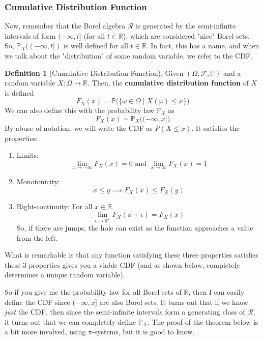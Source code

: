 \documentclass{article}
\theoremstyle{definition}
\theoremstyle{remark}
\theoremstyle{definition}
\newtheorem{definition}{Definition}[section]
\begin{document}
\subsubsection{Cumulative Distribution Function}

Now, remember that the Borel algebra $\mathcal{R}$ is generated by the semi-infinite intervals of form $(-\infty, t]$ (for all $t \in \mathbb{R}$), which are considered "nice" Borel sets. So, $\mathbb{P}_X( (-\infty, t])$ is well defined for all $t \in \mathbb{R}$. In fact, this has a name, and when we talk about the "distribution" of some random variable, we refer to the CDF. 

\begin{definition}[Cumulative Distribution Function]
Given $(\Omega, \mathcal{F}, \mathbb{P})$ and a random variable $X: \Omega \rightarrow \mathbb{R}$. Then, the \textbf{cumulative distribution function} of $X$ is defined 
\[F_X (x) =\mathbb{P}\big( \{\omega \in \Omega \mid X(\omega) \leq x\} \big)\]
We can also define this with the probability law $\mathbb{P}_X$ as 
\[F_X (x) = \mathbb{P}_X \big( (-\infty, x] \big) \]
By abuse of notation, we will write the CDF as $P(X \leq x)$. It satisfies the properties: 
\begin{enumerate}
    \item Limits: 
    \[\lim_{x \rightarrow -\infty} F_X (x) = 0 \text{ and } \lim_{x \rightarrow \infty} F_X (x) = 1\]
    \item Monotonicity: 
    \[x \leq y \implies F_X (x) \leq F_X (y)\]
    \item Right-continuity: For all $x \in \mathbb{R}$
    \[\lim_{\epsilon \rightarrow 0^+} F_X (x + \epsilon) = F_X (x)\]
    So, if there are jumps, the hole can exist as the function approaches a value from the left. 
\end{enumerate}
What is remarkable is that any function satisfying these three properties satisfies these 3 properties gives you a viable CDF (and as shown below, completely determines a unique random variable). 
\end{definition}

So if you give me the probability law for all Borel sets of $\mathbb{R}$, then I can easily define the CDF since $(-\infty, x]$ are also Borel sets. It turns out that if we know \textit{just} the CDF, then since the semi-infinite intervals form a generating class of $\mathcal{R}$, it turns out that we can completely define $\mathbb{P}_X$. The proof of the theorem below is a bit more involved, using $\pi$-systems, but it is good to know. 
\end{document}
